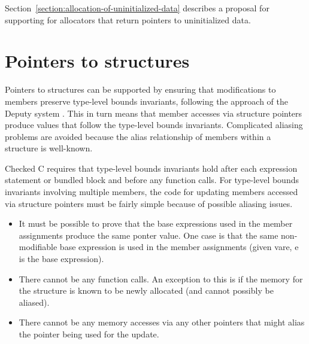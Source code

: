   Section~\ref{section:allocation-of-uninitialized-data} 
describes a proposal for supporting for allocators that return pointers to
uninitialized data.
 
\section{Pointers to structures}

Pointers to  structures can be supported by ensuring that modifications to members
preserve type-level bounds invariants, following the approach of the Deputy
system \cite{Condit2007}.  This in turn means that member accesses via structure
pointers produce values that follow the type-level bounds invariants.  
Complicated aliasing problems are avoided because the
alias relationship of members within a structure is well-known.

Checked C requires that type-level bounds invariants hold after each expression
statement or bundled block and before any function calls.  For type-level bounds
invariants involving multiple members, the code for updating members accessed
via structure pointers must be fairly simple because of possible aliasing issues.
\begin{itemize}
\item It must be possible to prove that the base expressions used in the
member assignments produce the same ponter value.  One case is that the same
non-modifiable base expression is used in the member assignments  (given
var{e}, e is the base expression).
\item There cannot be any function calls.  An exception to this is if the memory
for the structure is known to be newly allocated (and cannot possibly be aliased).
\item There cannot be any memory accesses via any other pointers that might alias
the pointer being used for the update.
\end{itemize}


